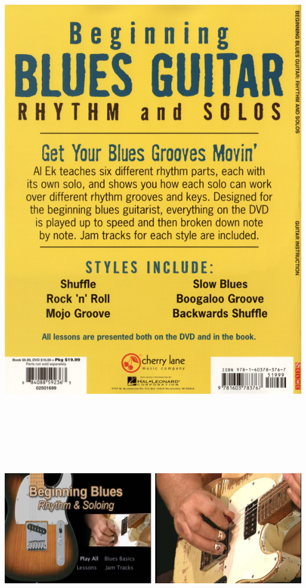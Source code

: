 \documentclass[a4paper]{book}
\begin{document}
\begin{center}
\includegraphics[width=17cm,height=22.306cm]{lebluessupportsmethodes-img50.jpg}
\end{center}
\clearpage

\begin{center}
\includegraphics[width=17cm,height=6.292cm]{lebluessupportsmethodes-img51.jpg}
\end{center}
\end{document}
